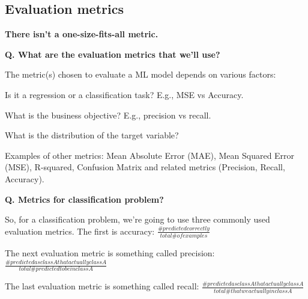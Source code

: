 \subsection{Evaluation metrics}
\begin{transitionsubframe}
  \begin{center}
    \Huge \textbf{There isn't a one-size-fits-all metric.}
  \end{center}
\end{transitionsubframe}

\begin{frame}[fragile]{\textbf{Q. What are the evaluation metrics that we'll use?}}
\begin{wideitemize}
  \item The metric(s) chosen to evaluate a ML model depends on various factors:
  \begin{wideitemize}
    \item Is it a regression or a classification task? E.g., MSE vs Accuracy.
    \item What is the business objective? E.g., precision vs recall.
    \item What is the distribution of the target variable?
  \end{wideitemize}
  \item Examples of other metrics: Mean Absolute Error (MAE), Mean Squared Error
    (MSE), R-squared, Confusion Matrix and related metrics (Precision, Recall, Accuracy).
\end{wideitemize}
\end{frame}


\begin{frame}[fragile]{\textbf{Q. Metrics for classification problem?}}
\begin{wideitemize}
  \item So, for a classification problem, we're going to use three commonly
  used evaluation metrics. The first is accuracy:
  $\frac{\# predicted correctly}{total \# of examples}$
  \item The next evaluation metric is something called precision:
  $\frac{\# predicted as class A that actually class A}{total \# predicted to be in class A}$
  \item The last evaluation metric is something called recall:
  $\frac{\# predicted as class A that actually class A}{total \# that we actually in class A}$
\end{wideitemize}
\end{frame}

